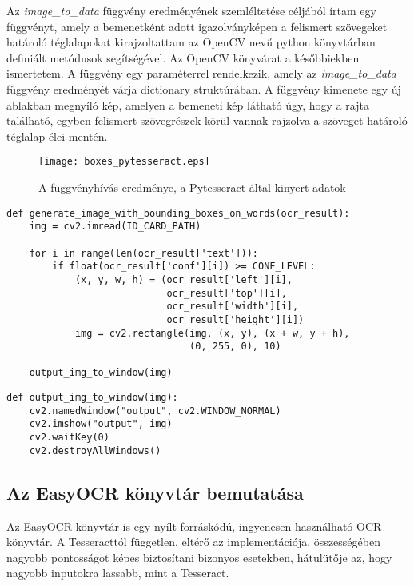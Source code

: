 \documentclass[12pt]{report}
\begin{document}
\pagebreak
Az \textit{image\_to\_data} függvény eredményének szemléltetése céljából írtam egy függvényt, amely a bemenetként adott igazolványképen a felismert szövegeket határoló téglalapokat kirajzoltattam az OpenCV nevű python könyvtárban definiált metódusok segítségével. Az OpenCV könyvárat a későbbiekben ismertetem. A függvény egy paraméterrel rendelkezik, amely az \textit{image\_to\_data} függvény eredményét várja dictionary struktúrában. A függvény kimenete egy új ablakban megnyíló kép, amelyen a bemeneti kép látható úgy, hogy a rajta található, egyben felismert szövegrészek körül vannak rajzolva a szöveget határoló téglalap élei mentén.

\begin{figure}[h]
    \centerline{\texttt{[image: boxes\_pytesseract.eps]}}
    \caption{A függvényhívás eredménye, a Pytesseract által kinyert adatok}
\end{figure}

\begin{verbatim}
def generate_image_with_bounding_boxes_on_words(ocr_result):
    img = cv2.imread(ID_CARD_PATH)

    for i in range(len(ocr_result['text'])):
        if float(ocr_result['conf'][i]) >= CONF_LEVEL:
            (x, y, w, h) = (ocr_result['left'][i],
                            ocr_result['top'][i],
                            ocr_result['width'][i],
                            ocr_result['height'][i])
            img = cv2.rectangle(img, (x, y), (x + w, y + h),
                                (0, 255, 0), 10)

    output_img_to_window(img)
\end{verbatim}

\begin{verbatim}
def output_img_to_window(img):
    cv2.namedWindow("output", cv2.WINDOW_NORMAL)
    cv2.imshow("output", img)
    cv2.waitKey(0)
    cv2.destroyAllWindows()
\end{verbatim}

\subsection{Az EasyOCR könyvtár bemutatása}

Az EasyOCR könyvtár is egy nyílt forráskódú, ingyenesen használható OCR könyvtár. A Tesseracttól független, eltérő az implementációja, összességében nagyobb pontosságot képes biztosítani bizonyos esetekben, hátulütője az, hogy nagyobb inputokra lassabb, mint a Tesseract.
\end{document}
